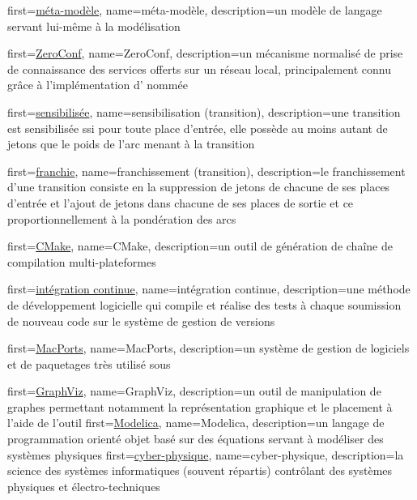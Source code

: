 {
	first={\underline{méta-modèle}},
	name={méta-modèle},
	description={un modèle de langage servant lui-même à la modélisation}	
}

{
	first={\underline{ZeroConf}},
	name={ZeroConf},
	description={un mécanisme normalisé de prise de connaissance des services offerts sur un réseau local, principalement connu grâce à l'implémentation d' nommée }	
}

{
	first={\underline{sensibilisée}},
	name={sensibilisation (transition)},
	description={une transition est sensibilisée ssi pour toute place d'entrée, elle possède au moins autant de jetons que le poids de l'arc menant à la transition~\cite[p. 35]{allombert2009aspects}}	
}

{
	first={\underline{franchie}},
	name={franchissement (transition)},
	description={le franchissement d'une transition consiste en la suppression de jetons de chacune de ses places d'entrée et l'ajout de jetons dans chacune de ses places de sortie et ce proportionnellement à la pondération des arcs}	
}

{
	first={\underline{CMake}},
	name={CMake}, 
	description={un outil de génération de chaîne de compilation multi-plateformes}
}

{
	first={\underline{intégration continue}},
	name={intégration continue},
	description={une méthode de développement logicielle qui compile et réalise des tests à chaque soumission de nouveau code sur le système de gestion de versions}
}

{
	first={\underline{MacPorts}},
	name=MacPorts, 
	description={un système de gestion de logiciels et de paquetages très utilisé sous }
}

{
	first={\underline{GraphViz}},
	name=GraphViz, 
	description={un outil de manipulation de graphes permettant notamment la représentation graphique et le placement à l'aide de l'outil }
}
{
	first={\underline{Modelica}},
	name=Modelica, 
	description={un langage de programmation orienté objet basé sur des équations servant à modéliser des systèmes physiques}
}
{
	first={\underline{cyber-physique}},
	name=cyber-physique, 
	description={la science des systèmes informatiques (souvent répartis) contrôlant des systèmes physiques et électro-techniques}
}

